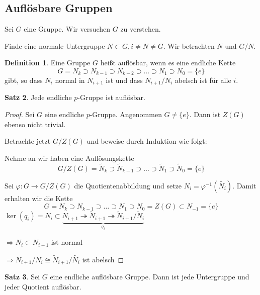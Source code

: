 \documentclass[12pt,parskip=full]{scrartcl}
\theoremstyle{definition}
\newtheorem{theorem}{Satz}[section]
\newtheorem{definition}[theorem]{Definition}
\theoremstyle{remark}
\begin{document}
	\subsection{Auflösbare Gruppen}
	
	Sei $G$ eine Gruppe. Wir versuchen $G$ zu verstehen.
	
	Finde eine normale Untergruppe $N \subset G, i \neq N \neq G$. Wir betrachten $N$ und $G/N$.
	
	\begin{definition}
		Eine Gruppe $G$ heißt auflösbar, wenn es eine endliche Kette
		\begin{equation*}
			G = N_k \supset N_{k-1} \supset N_{k-2} \supset \dots \supset N_1 \supset N_0 = \{ e \}
		\end{equation*}
		gibt, so dass $N_i$ normal in $N_{i+1}$ ist und dass $N_{i+1}/N_i$ abelsch ist für alle $i$.
	\end{definition}

	\begin{theorem}
		Jede endliche $p$-Gruppe ist auflösbar.
	\end{theorem}
	
	\begin{proof}
		Sei $G$ eine endliche $p$-Gruppe. Angenommen $G \neq \{ e \}$. Dann ist $Z(G)$ ebenso nicht trivial.
		
		Betrachte jetzt $G/Z(G)$ und beweise durch Induktion wie folgt:
		
		Nehme an wir haben eine Auflösungskette
		\begin{equation*}
			G/Z(G) = \tilde{N}_k \supset \tilde{N}_{k-1} \supset \dots \supset \tilde{N}_1 \supset \tilde{N}_0 = \{ e \}
		\end{equation*}
		
		Sei $\varphi: G \to G/Z(G)$ die Quotientenabbildung und setze $N_i = \varphi^{-1}(\tilde{N_i})$. Damit erhalten wir die Kette
		\begin{equation*}
			G = N_k \supset N_{k-1} \supset \dots \supset N_1 \supset N_0 = Z(G) \subset N_{-1} = \{ e \}
		\end{equation*}
		$\ker(q_i) = N_i \subset\underbrace{ N_{i+1} \twoheadrightarrow \tilde{N}_{i+1} \twoheadrightarrow \tilde{N}_{i+1}/\tilde{N}_i}_{q_i}$
		
		$\Rightarrow N_i \subset N_{i+1}$ ist normal
		
		$\Rightarrow N_{i+1}/N_i \cong \tilde{N}_{i+1}/\tilde{N_i}$ ist abelsch		
	\end{proof}

	\begin{theorem}
		Sei $G$ eine endliche auflösbare Gruppe. Dann ist jede Untergruppe und jeder Quotient auflösbar.
	\end{theorem}
\end{document}

